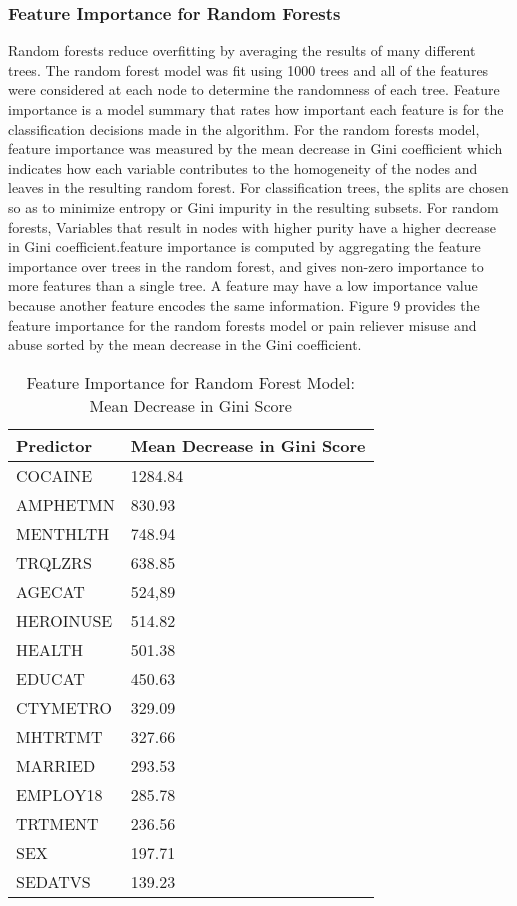 \documentclass[sigconf]{acmart}
\begin{document}
\subsubsection{Feature Importance for Random Forests}

Random forests reduce overfitting by averaging the results of many different
trees. The random forest model was fit using 1000 trees and all of the features 
were considered at each node to determine the randomness of each tree.
Feature importance is a model summary that rates how important each feature is 
for the classification decisions made in the algorithm. For the random forests 
model, feature importance was measured by the mean decrease in Gini coefficient 
which indicates how each variable contributes to the homogeneity of the nodes 
and leaves in the resulting random forest. For classification trees, the splits 
are chosen so as to minimize entropy or Gini impurity in the resulting subsets.
For random forests, Variables that result in nodes with higher purity have a 
higher decrease in Gini coefficient.feature importance is computed by 
aggregating the feature importance over trees in the random forest, and gives 
non-zero importance to more features than a single tree.  A feature may have 
a low importance value because another feature encodes the same information. 
Figure 9 provides the feature importance for the random forests model or pain 
reliever misuse and abuse sorted by the mean decrease in the Gini coefficient. 


\begin{table}
  \caption{Feature Importance for Random Forest Model: Mean Decrease in Gini
  Score}
  \label{tab:freq}
  \begin{tabular}{ll}
    \toprule
    Predictor&  Mean Decrease in Gini Score  \\    
    \midrule
    COCAINE   & 1284.84 \\
    AMPHETMN  &  830.93 \\
    MENTHLTH  &  748.94 \\ 
    TRQLZRS   &  638.85 \\
    AGECAT    &  524,89 \\
    HEROINUSE &  514.82 \\
    HEALTH    &  501.38 \\
    EDUCAT    &  450.63 \\
    CTYMETRO  &  329.09 \\
    MHTRTMT   &  327.66 \\
    MARRIED   &  293.53 \\
    EMPLOY18  &  285.78 \\ 
    TRTMENT   &  236.56 \\
    SEX       &  197.71 \\
    SEDATVS   &  139.23 \\
    \bottomrule
  \end{tabular}
\end{table}
\end{document}
